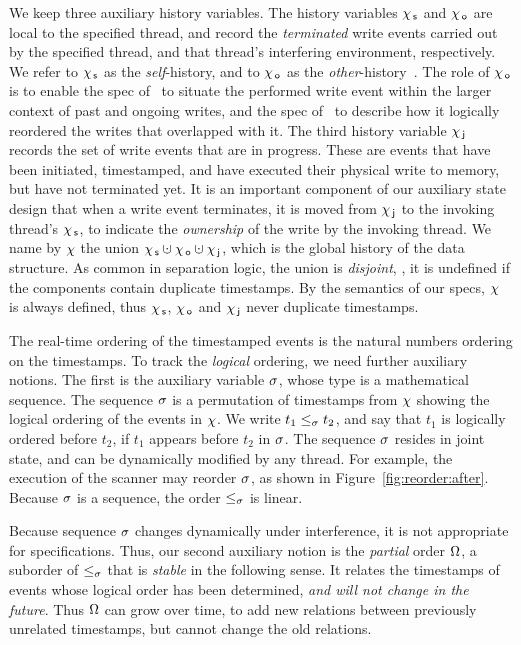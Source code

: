 We keep three auxiliary history variables. The history variables
$\chi_{\, \mathsf{s}}$ and $\chi_{\, \mathsf{o}}$ are local to the specified thread, and record
the \emph{terminated} write events carried out by the specified
thread, and that thread's interfering environment, respectively. We
refer to $\chi_{\, \mathsf{s}}$ as the \emph{self}-history, and to $\chi_{\, \mathsf{o}}$ as the \emph{other}-history~\cite{LeyWildN+POPL13,NanevskiLSD+ESOP14,OPLSS:Notes,SergeyNB+ESOP15}. The
role of $\chi_{\, \mathsf{o}}$ is to enable the spec of \jywrite\ to situate the
performed write event within the larger context of past and ongoing
writes, and the spec of \jyscan\ to describe how it logically
reordered the writes that overlapped with it.
%
The third history variable $\chi_{\, \mathsf{j}}$ records the set of write events
that are in progress. These are events that have been initiated,
timestamped, and have executed their physical write to memory, but
have not terminated yet. It is an important component of our auxiliary
state design that when a write event terminates, it is moved from
$\chi_{\, \mathsf{j}}$ to the invoking thread's $\chi_{\, \mathsf{s}}$, to indicate the
\emph{ownership} of the write by the invoking thread.
%
We name by $\chi$ the union $\histS \hunion \histO \hunion \histJ$,
which is the global history of the data structure. As common in
separation logic, the union is \emph{disjoint}, \ie, it is undefined
if the components contain duplicate timestamps. By the semantics of
our specs, $\chi$ is always defined, thus $\chi_{\, \mathsf{s}}$, $\chi_{\, \mathsf{o}}$ and
$\chi_{\, \mathsf{j}}$ never duplicate timestamps.

The real-time ordering of the timestamped events is the natural
numbers ordering on the timestamps. To track the \emph{logical}
ordering, we need further auxiliary notions.
%
The first is the auxiliary variable $\sigma$, whose type is a
mathematical sequence. The sequence $\sigma$ is a permutation of
timestamps from $\chi$ showing the logical ordering of the events in
$\chi$. We write $t_1 \mathrel{\leq_\sigma} t_2$, and say that $t_1$ is logically
ordered before $t_2$, if $t_1$ appears before $t_2$ in $\sigma$. The
sequence $\sigma$ resides in joint state, and can be dynamically
modified by any thread. For example, the execution of the scanner may
reorder $\sigma$, as shown in
Figure~\ref{fig:reorder:after}. Because $\sigma$ is a sequence, the
order $\mathrel{\leq_\sigma}$ is linear.

%
%

Because sequence $\sigma$ changes dynamically under interference, it
is not appropriate for specifications. Thus, our second auxiliary
notion is the \emph{partial} order $\Omega$, a suborder of
$\mathrel{\leq_\sigma}$ that is \emph{stable} in the following sense. It relates the
timestamps of events whose logical order has been determined,
\emph{and will not change in the future}. Thus $\Omega$ can grow
over time, to add new relations between previously unrelated
timestamps, but cannot change the old relations.

